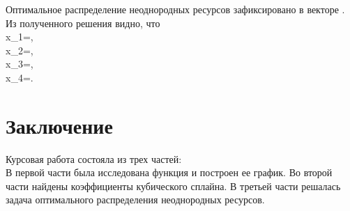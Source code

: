 \documentclass[russian,utf8,nocolumnxxxi,nocolumnxxxii]{eskdtext}
\begin{document}
      \newpage
      Оптимальное распределение неоднородных ресурсов зафиксировано в векторе . Из полученного решения видно, что\\
      {x_1}={},\\ {x_2}={},\\{x_3}={},\\ {x_4}={}. \\
      	
      	\newpage
      	\section{ Заключение}
      	Курсовая работа состояла из трех частей: \\В первой части была исследована функция и построен ее график. Во второй части найдены коэффициенты кубического сплайна. В третьей части решалась задача оптимального распределения неоднородных ресурсов.
      	
      	
      	
\end{document}
